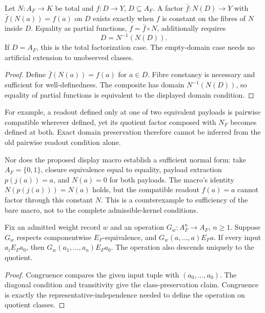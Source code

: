 \begin{proposition}
\label{v480:kernel-partial-factorization}
Let $N:A_F\to K$ be total and $f:D\to Y$, $D\subseteq A_F$.
A factor $\bar f:N(D)\to Y$ with $\bar f(N(a))=f(a)$ on $D$
exists exactly when $f$ is constant on the fibres of $N$ inside $D$.
Equality as partial functions, $f=\bar f\circ N$, additionally requires
\[
 D=N^{-1}(N(D)).
\]
If $D=A_F$, this is the total factorization case. The empty-domain
case needs no artificial extension to unobserved classes.
\end{proposition}
\begin{proof}
Define $\bar f(N(a))=f(a)$ for $a\in D$. Fibre constancy is
necessary and sufficient for well-definedness. The composite has
domain $N^{-1}(N(D))$, so equality of partial functions is
equivalent to the displayed domain condition.
\end{proof}

For example, a readout defined only at one of two equivalent
payloads is pairwise compatible wherever defined, yet its quotient
factor composed with $N_F$ becomes defined at both. Exact domain
preservation therefore cannot be inferred from the old pairwise
readout condition alone.

Nor does the proposed display macro establish a sufficient normal
form: take $A_F=\{0,1\}$, closure equivalence equal to equality,
payload extraction $p(j(a))=a$, and $N(a)=0$ for both payloads.
The macro's identity $N(p(j(a)))=N(a)$ holds, but the compatible
readout $f(a)=a$ cannot factor through this constant $N$.
This is a counterexample to sufficiency of the bare macro, not to
the complete admissible-kernel conditions.

\begin{proposition}
\label{v480:kernel-routed-condition}
Fix an admitted weight record $w$ and an operation
$G_w:A_F^n\to A_F$, $n\geq1$. Suppose $G_w$ respects componentwise
$E_F$-equivalence, and $G_w(a,\ldots,a)E_Fa$. If every input
$a_iE_Fa_0$, then $G_w(a_1,\ldots,a_n)E_Fa_0$. The operation
also descends uniquely to the quotient.
\end{proposition}
\begin{proof}
Congruence compares the given input tuple with $(a_0,\ldots,a_0)$.
The diagonal condition and transitivity give the class-preservation
claim. Congruence is exactly the representative-independence
needed to define the operation on quotient classes.
\end{proof}

